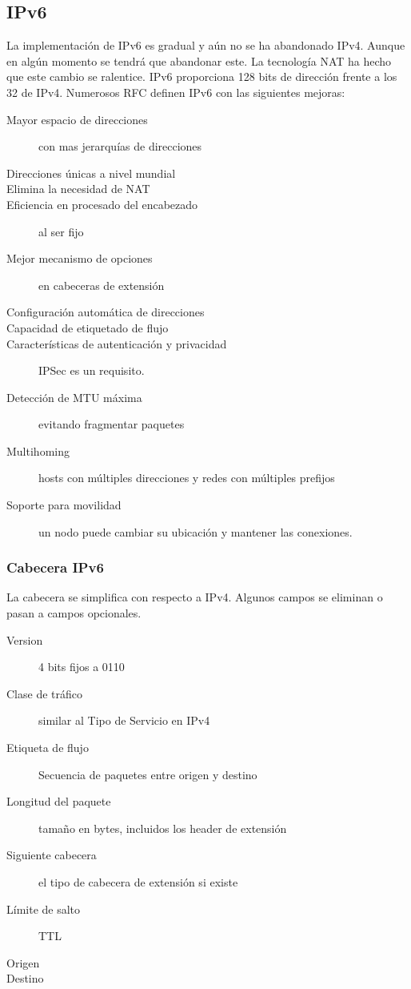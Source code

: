 \subsection{IPv6} %
            La implementación de IPv6 es gradual y aún no se ha abandonado IPv4. Aunque en algún momento se tendrá que abandonar este. La tecnología NAT ha hecho que este cambio se ralentice. IPv6 proporciona 128 bits de dirección frente a los 32 de IPv4. Numerosos RFC definen IPv6 con las siguientes mejoras:
            \begin{description}
                \item[Mayor espacio de direcciones] con mas jerarquías de direcciones
                \item[Direcciones únicas a nivel mundial]
                \item[Elimina la necesidad de NAT] 
                \item[Eficiencia en procesado del encabezado] al ser fijo
                \item[Mejor mecanismo de opciones] en cabeceras de extensión
                \item[Configuración automática de direcciones]
                \item[Capacidad de etiquetado de flujo]
                \item[Características de autenticación y privacidad] IPSec es un requisito.
                \item[Detección de MTU máxima] evitando fragmentar paquetes
                \item[Multihoming] hosts con múltiples direcciones y redes con múltiples prefijos
                \item[Soporte para movilidad] un nodo puede cambiar su ubicación y mantener las conexiones.
            \end{description}

    \subsubsection{Cabecera IPv6} %
            La cabecera se simplifica con respecto a IPv4. Algunos campos se eliminan o pasan a campos opcionales.
            \begin{description}
                \item[Version] 4 bits fijos a 0110
                \item[Clase de tráfico] similar al Tipo de Servicio en IPv4
                \item[Etiqueta de flujo] Secuencia de paquetes entre origen y destino
                \item[Longitud del paquete] tamaño en bytes, incluidos los header de extensión
                \item[Siguiente cabecera] el tipo de cabecera de extensión si existe
                \item[Límite de salto] TTL
                \item[Origen]
                \item[Destino]
            \end{description}

